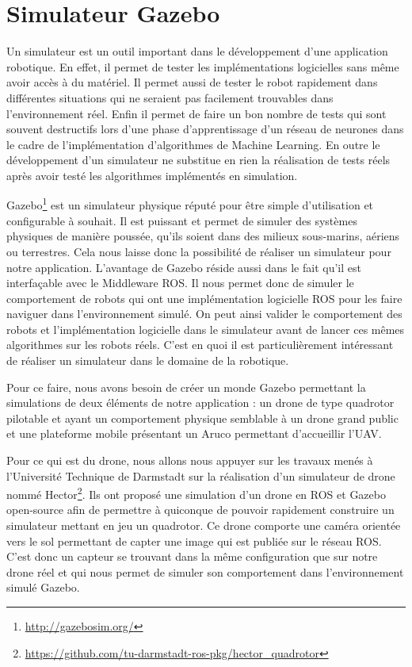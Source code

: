 \section{Simulateur Gazebo}

Un simulateur est un outil important dans le développement d’une application robotique. En effet, il permet de tester les implémentations logicielles sans même avoir accès à du matériel. Il permet aussi de tester le robot rapidement dans différentes situations qui ne seraient pas facilement trouvables dans l’environnement réel. Enfin il permet de faire un bon nombre de tests qui sont souvent destructifs lors d’une phase d’apprentissage d’un réseau de neurones dans le cadre de l’implémentation d’algorithmes de Machine Learning. En outre le développement d’un simulateur ne substitue en rien la réalisation de tests réels après avoir testé les algorithmes implémentés en simulation.

Gazebo\footnote{\url{http://gazebosim.org/}} est un simulateur physique réputé pour être simple d’utilisation et configurable à souhait. Il est puissant et permet de simuler des systèmes physiques de manière poussée, qu’ils soient dans des milieux sous-marins, aériens ou terrestres. Cela nous laisse donc la possibilité de réaliser un simulateur pour notre application. L’avantage de Gazebo réside aussi dans le fait qu’il est interfaçable avec le Middleware ROS. Il nous permet donc de simuler le comportement de robots qui ont une implémentation logicielle ROS pour les faire naviguer dans l’environnement simulé. On peut ainsi valider le comportement des robots et l’implémentation logicielle dans le simulateur avant de lancer ces mêmes algorithmes sur les robots réels. C’est en quoi il est particulièrement intéressant de réaliser un simulateur dans le domaine de la robotique.

Pour ce faire, nous avons besoin de créer un monde Gazebo permettant la simulations de deux éléments de notre application : un drone de type quadrotor pilotable et ayant un comportement physique semblable à un drone grand public et une plateforme mobile présentant un Aruco permettant d'accueillir l’UAV. 

Pour ce qui est du drone, nous allons nous appuyer sur les travaux menés à l’Université Technique de Darmstadt sur la réalisation d’un simulateur de drone nommé Hector\footnote{\url{https://github.com/tu-darmstadt-ros-pkg/hector_quadrotor}}. Ils ont proposé une simulation d’un drone en ROS et Gazebo open-source afin de permettre à quiconque de pouvoir rapidement construire un simulateur mettant en jeu un quadrotor. Ce drone comporte une caméra orientée vers le sol permettant de capter une image qui est publiée sur le réseau ROS. C’est donc un capteur se trouvant dans la même configuration que sur notre drone réel et qui nous permet de simuler son comportement dans l’environnement simulé Gazebo.

